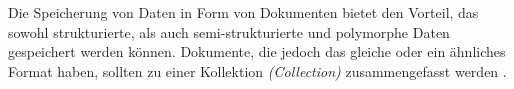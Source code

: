 Die Speicherung von Daten in Form von Dokumenten bietet den Vorteil, das sowohl strukturierte, als auch semi-strukturierte und polymorphe Daten gespeichert werden können. Dokumente, die jedoch das gleiche oder ein ähnliches Format haben, sollten zu einer Kollektion \textit{(Collection)} zusammengefasst werden \cite{documentInMongo}.

%
%
%
